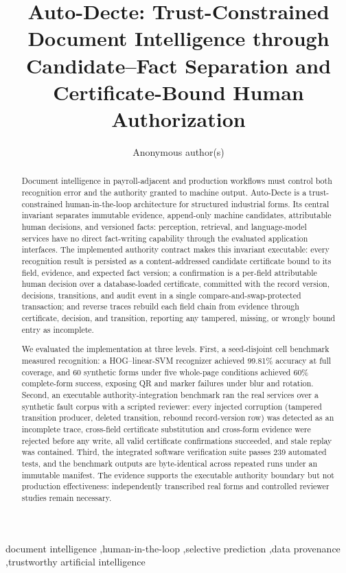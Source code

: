 \documentclass[preprint,12pt,authoryear]{elsarticle}
\begin{document}
\begin{frontmatter}

\title{Auto-Decte: Trust-Constrained Document Intelligence through Candidate--Fact Separation and Certificate-Bound Human Authorization}

\author{Anonymous author(s)}

\begin{abstract}
Document intelligence in payroll-adjacent and production workflows must control both recognition error and the authority granted to machine output. Auto-Decte is a trust-constrained human-in-the-loop architecture for structured industrial forms. Its central invariant separates immutable evidence, append-only machine candidates, attributable human decisions, and versioned facts: perception, retrieval, and language-model services have no direct fact-writing capability through the evaluated application interfaces. The implemented authority contract makes this invariant executable: every recognition result is persisted as a content-addressed candidate certificate bound to its field, evidence, and expected fact version; a confirmation is a per-field attributable human decision over a database-loaded certificate, committed with the record version, decisions, transitions, and audit event in a single compare-and-swap-protected transaction; and reverse traces rebuild each field chain from evidence through certificate, decision, and transition, reporting any tampered, missing, or wrongly bound entry as incomplete.

We evaluated the implementation at three levels. First, a seed-disjoint cell benchmark measured recognition: a HOG--linear-SVM recognizer achieved 99.81\% accuracy at full coverage, and 60 synthetic forms under five whole-page conditions achieved 60\% complete-form success, exposing QR and marker failures under blur and rotation. Second, an executable authority-integration benchmark ran the real services over a synthetic fault corpus with a scripted reviewer: every injected corruption (tampered transition producer, deleted transition, rebound record-version row) was detected as an incomplete trace, cross-field certificate substitution and cross-form evidence were rejected before any write, all valid certificate confirmations succeeded, and stale replay was contained. Third, the integrated software verification suite passes 239 automated tests, and the benchmark outputs are byte-identical across repeated runs under an immutable manifest. The evidence supports the executable authority boundary but not production effectiveness: independently transcribed real forms and controlled reviewer studies remain necessary.
\end{abstract}

\begin{keyword}
document intelligence \sep human-in-the-loop \sep selective prediction \sep data provenance \sep trustworthy artificial intelligence
\end{keyword}
\end{frontmatter}
\end{document}
